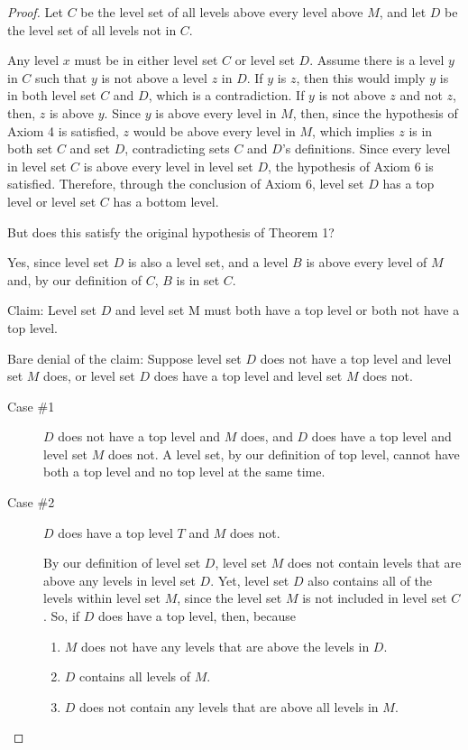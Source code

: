 \documentclass[12pt]{article}
\begin{document}
\begin{proof}
    Let $C$ be the level set of all levels above every level above $M$, and let $D$ be the level set of all levels not in $C$.

    Any level $x$ must be in either level set $C$ or level set $D$. Assume there is a level $y$ in $C$ such that $y$ is not above a level $z$ in $D$. If $y$ is $z$, then this would imply $y$ is in both level set $C$ and $D$, which is a contradiction. If $y$ is not above $z$ and not $z$, then, $z$ is above $y$. Since $y$ is above every level in $M$, then, since the hypothesis of Axiom 4 is satisfied, $z$ would be above every level in $M$, which implies $z$ is in both set $C$ and set $D$, contradicting sets $C$ and $D$'s definitions. Since every level in level set $C$ is above every level in level set $D$, the hypothesis of Axiom 6 is satisfied. Therefore, through the conclusion of Axiom 6, level set $D$ has a top level or level set $C$ has a bottom level.

    But does this satisfy the original hypothesis of Theorem 1?

    Yes, since level set $D$ is also a level set, and a level $B$ is above every level of $M$ and, by our definition of $C$, $B$ is in set $C$.

    Claim: Level set $D$ and level set M must both have a top level or both not have a top level.

    Bare denial of the claim: Suppose level set $D$ does not have a top level and level set $M$ does, or level set $D$ does have a top level and level set $M$ does not.


    \begin{description}
        \item[Case \#1] $D$ does not have a top level and $M$ does, and $D$ does have a top level and level set $M$ does not. A level set, by our definition of top level, cannot have both a top level and no top level at the same time.

        \item[Case \#2] $D$ does have a top level $T$ and $M$ does not.

        By our definition of level set $D$, level set $M$ does not contain levels that are above any levels in level set $D$. Yet, level set $D$ also contains all of the levels within level set $M$, since the level set $M$ is not included in level set $C$. So, if $D$ does have a top level, then, because

        \begin{enumerate}
            \item $M$ does not have any levels that are above the levels in $D$.
            \item $D$ contains all levels of $M$.
            \item $D$ does not contain any levels that are above all levels in $M$.
        \end{enumerate}


\end{description}
\end{proof}
\end{document}
